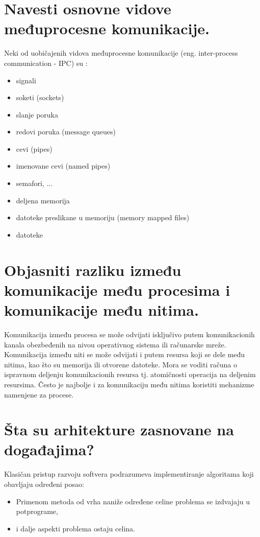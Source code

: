 \documentclass[a4paper]{article}
\begin{document}
\section{Navesti osnovne vidove međuprocesne komunikacije.}
  Neki od uobičajenih vidova međuprocesne komunikacije (eng. inter-process communication - IPC) su :
  \begin{itemize}
    \item signali
    \item soketi (sockets)
    \item slanje poruka
    \item redovi poruka (message queues)
    \item cevi (pipes)
    \item imenovane cevi (named pipes)
    \item semafori, ...
    \item deljena memorija
    \item datoteke preslikane u memoriju (memory mapped files)
    \item datoteke
  \end{itemize}

\section{Objasniti razliku između komunikacije među procesima i komunikacije među nitima.}
  Komunikacija između procesa se može odvijati isključivo putem komunikacionih kanala obezbeđenih 
  na nivou operativnog sistema ili računarske mreže.
  Komunikacija između niti se može odvijati i putem resursa koji se dele među nitima, 
  kao što su memorija ili otvorene datoteke. Mora se voditi računa o ispravnom deljenju 
  komunikacionih resursa tj. atomičnosti operacija na deljenim resursima. 
  Često je najbolje i za komunikaciju među nitima koristiti mehanizme namenjene za procese.
  

\section{Šta su arhitekture zasnovane na događajima?}
  Klasičan pristup razvoju softvera podrazumeva implementiranje algoritama 
  koji obavljaju određeni posao:
  \begin{itemize}
    \item Primenom metoda od vrha naniže određene celine problema se izdvajaju u potprograme,
    \item i dalje aspekti problema ostaju celina.
  \end{itemize}
\end{document}
